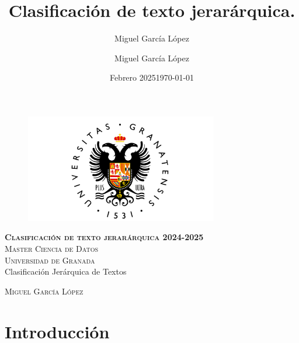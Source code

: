 \documentclass[12pt,letterpaper]{article}
\title{Clasificación de texto jerarárquica.}
\author{Miguel García López}
\date{Febrero 2025}
\author{Miguel García López} %
\date{\normalsize\today} %
\begin{document}
\begin{titlepage}
\begin{figure}
    \vspace{-1.3cm}
    \begin{center}
        \includegraphics[width=0.75\textwidth]{img/UGR-Logo.png}
    \end{center}
\end{figure}
\vspace{1.3cm}
\centering
\normalfont \normalsize
\textsc{\textbf{Clasificación de texto jerarárquica 2024-2025} \\ \vspace{.15cm} Master Ciencia de Datos\\ \vspace{.15cm} Universidad de Granada} \\ [25pt] 
    \huge Clasificación Jerárquica de Textos

\normalfont \normalsize \vspace{.30cm}
\textsc{Miguel García López}

\end{titlepage}

\tableofcontents
\listoffigures
\listoftables
\newpage

\section{Introducción}
\end{document}
